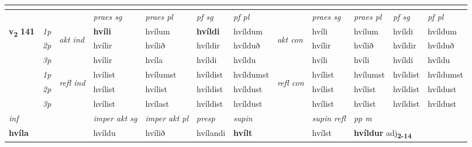 \begin{longtable}[l]{X>{\footnotesize\itshape}llXXXXlXXXX}
  & \\
   \midrule
 & &   & \textit{praes sg}  & \textit{praes pl}    & \textit{ pf sg} & \textit{pf pl} & & \textit{praes sg}  & \textit{praes pl}    & \textit{pf sg} & \textit{pf pl }  \\ \cmidrule{4-7} \cmidrule{9-12}
 \multirow{2}{*}{{{\textbf{v{\textsubscript{2}}} \Large{\textbf{141}}}}}  & 1p & \multirow{3}{*}{\begin{turn}{90}\textit{akt ind}\end{turn}} & \textbf{hvíli} & hvílum & \textbf{hvíldi} & hvíldum & \multirow{3}{*}{\begin{turn}{90}\textit{akt con}\end{turn}} &hvíli & hvílum & hvíldi & hvíldum\\*
 & 2p &  &  hvílir  & hvílið & hvíldir & hvílduð & & hvílir & hvílið & hvíldir & hvílduð \\*
 & 3p &  & hvílir & hvíla & hvíldi & hvíldu & & hvíli & hvíli& hvíldi & hvíldu \\*
\cmidrule{4-7} \cmidrule{9-12}
 & 1p & \multirow{3}{*}{\begin{turn}{90}\textit{refl ind}\end{turn}}  & hvílist & hvílumst & hvíldist & hvíldumst & \multirow{3}{*}{\begin{turn}{90}\textit{refl con}\end{turn}}  &hvílist & hvílumst & hvíldist & hvíldumst \\*
 & 2p &  & hvílist & hvílist & hvíldist & hvíldust & &hvílist & hvílist & hvíldist & hvíldust \\*
 & 3p  & & hvílist & hvílast & hvíldist & hvíldust & & hvílist & hvílist& hvíldist & hvíldust \\*
\cmidrule{4-7} \cmidrule{9-12}

   {\textit{inf}} & &  & \textit{imper akt sg} & \textit{imper akt pl}   & \textit{presp} & \textit{supin} && \textit{supin refl} & \textit{pp m} \\*
  {\textbf{hvíla}} & && hvíldu  & hvílið   & hvílandi &  \textbf{hvílt} && hvílst & \multicolumn{2}{l}{\textbf{hvíldur} adj\textbf{\textsubscript{2-14}}} \\*

\midrule


\end{longtable}
